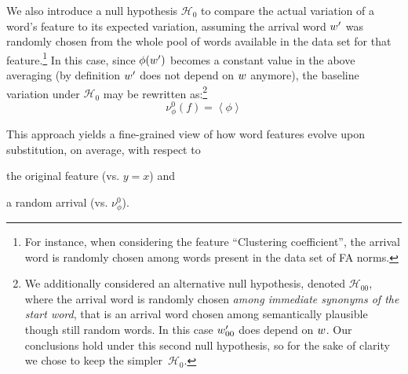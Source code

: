 We also introduce a null hypothesis $\mathcal{H}_0$ to compare the actual variation of a word's feature to its expected variation, assuming the arrival word $w'$ was randomly chosen from the whole pool of words available in the data set for that feature.\footnote{For instance, when considering the feature ``Clustering coefficient'', the arrival word is randomly chosen among words present in the data set of FA norms.}
In this case, since $\phi(w')$ becomes a constant value in the above averaging (by definition $w'$ does not depend on $w$ anymore),  the baseline variation under $\mathcal{H}_0$ may be rewritten as:\footnote{We additionally considered an alternative null hypothesis, denoted $\mathcal{H}_{00}$, where the arrival word is randomly chosen \emph{among immediate synonyms of the start word}, that is an arrival word chosen among semantically plausible though still random words. In this case $w'_{00}$ does depend on $w$. Our conclusions hold under this second null hypothesis, so for the sake of clarity we chose to keep the simpler~$\mathcal{H}_0$.}
$$\nu_{\phi}^0 (f) = \left<\phi\right>$$

This approach yields a fine-grained view of how word features evolve upon substitution, on average, with respect to
\begin{seriate}
\item the original feature (\hbox{vs.} $y=x$) and
\item a random arrival (\hbox{vs.} $\nu_{\phi}^0$).
\end{seriate}

